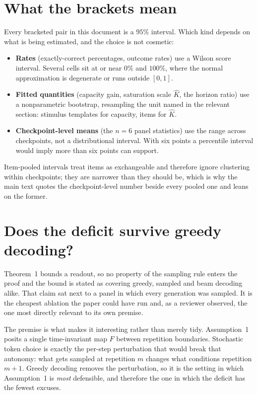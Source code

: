 \documentclass[11pt]{article}
\begin{document}
\section{What the brackets mean}

Every bracketed pair in this document is a $95\%$ interval. Which kind depends on
what is being estimated, and the choice is not cosmetic:

\begin{itemize}
\item \textbf{Rates} (exactly-correct percentages, outcome rates) use a Wilson
score interval. Several cells sit at or near $0\%$ and $100\%$, where the
normal approximation is degenerate or runs outside $[0,1]$.
\item \textbf{Fitted quantities} (capacity gain, saturation scale $\hat K$, the
horizon ratio) use a nonparametric bootstrap, resampling the unit named in the
relevant section: stimulus templates for capacity, items for $\hat K$.
\item \textbf{Checkpoint-level means} (the $n=6$ panel statistics) use the range
across checkpoints, not a distributional interval. With six points a percentile
interval would imply more than six points can support.
\end{itemize}

\noindent Item-pooled intervals treat items as exchangeable and therefore ignore
clustering within checkpoints; they are narrower than they should be, which is
why the main text quotes the checkpoint-level number beside every pooled one and
leans on the former.

\section{Does the deficit survive greedy decoding?}

Theorem~1 bounds a readout, so no property of the sampling rule enters the proof
and the bound is stated as covering greedy, sampled and beam decoding alike. That
claim sat next to a panel in which every generation was sampled. It is the
cheapest ablation the paper could have run and, as a reviewer observed, the one
most directly relevant to its own premise.

The premise is what makes it interesting rather than merely tidy. Assumption~1
posits a single time-invariant map $F$ between repetition boundaries. Stochastic
token choice is exactly the per-step perturbation that would break that
autonomy: what gets sampled at repetition $m$ changes what conditions repetition
$m+1$. Greedy decoding removes the perturbation, so it is the setting in which
Assumption~1 is \emph{most} defensible, and therefore the one in which the
deficit has the fewest excuses.
\end{document}
